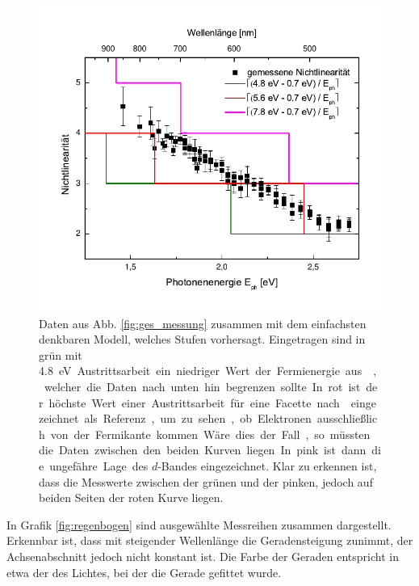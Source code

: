 \documentclass[bachelor,       %
               twoside,        %
               BCOR10mm,       %
               english,ngerman, %
               ]{GAUBM}
\begin{document}
\begin{figure}[h]
	\centering
	\includegraphics{Stufen}
	\caption{Daten aus Abb. \ref{fig:ges_messung} zusammen mit dem einfachsten denkbaren Modell, welches Stufen vorhersagt. Eingetragen sind in grün mit \SI{4.8}\eV Austrittsarbeit ein niedriger Wert der Fermienergie aus \cite{trasatti_operative_1974}, welcher die Daten nach unten hin begrenzen sollte. In rot ist der höchste Wert einer Austrittsarbeit für eine Facette nach \cite{crc} eingezeichnet als Referenz, um zu sehen, ob Elektronen ausschließlich von der Fermikante kommen. Wäre dies der Fall, so müssten die Daten zwischen den beiden Kurven liegen. In pink ist dann die ungefähre Lage des $d$-Bandes eingezeichnet. Klar zu erkennen ist, dass die Messwerte zwischen der grünen und der pinken, jedoch auf beiden Seiten der roten Kurve liegen.}
	\label{fig:stufen}
\end{figure}


In Grafik \ref{fig:regenbogen} sind ausgewählte Messreihen zusammen dargestellt.
Erkennbar ist, dass mit steigender Wellenlänge die Geradensteigung zunimmt, der Achsenabschnitt jedoch nicht konstant ist.
Die Farbe der Geraden entspricht in etwa der des Lichtes, bei der die Gerade gefittet wurde.
\end{document}
